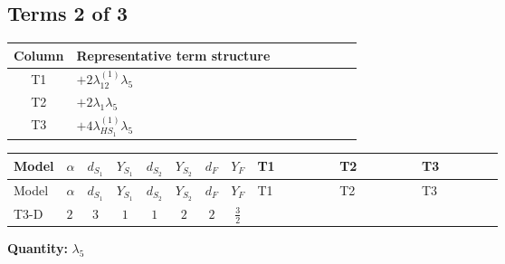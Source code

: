\documentclass[8pt]{article}
\begin{document}
\begin{landscape}
\subsection*{Terms 2 of 3}
\begin{center}
\begin{tabular}{@{}c >{\raggedright\arraybackslash}p{0.82\linewidth}@{}}
\toprule
Column & Representative term structure \\
\midrule
T1 & \(\displaystyle +2 {\lambda_{12}^{(1)}} {\lambda_5}\) \\
\midrule
T2 & \(\displaystyle +2 {\lambda_1} {\lambda_5}\) \\
\midrule
T3 & \(\displaystyle +4 {\lambda_{HS_1}^{(1)}} {\lambda_5}\) \\
\midrule
\bottomrule
\end{tabular}
\end{center}
\smallskip
\tiny
\begin{longtable}{@{}llcccccc >{\raggedright\arraybackslash}p{0.21\linewidth} >{\raggedright\arraybackslash}p{0.21\linewidth} >{\raggedright\arraybackslash}p{0.21\linewidth}@{}}
\toprule
Model & $\alpha$ & $d_{S_1}$ & $Y_{S_1}$ & $d_{S_2}$ & $Y_{S_2}$ & $d_F$ & $Y_F$ & T1 & T2 & T3 \\
\midrule
\endfirsthead
\toprule
Model & $\alpha$ & $d_{S_1}$ & $Y_{S_1}$ & $d_{S_2}$ & $Y_{S_2}$ & $d_F$ & $Y_F$ & T1 & T2 & T3 \\
\midrule
\endhead
T3-D & $2$ & $3$ & $1$ & $1$ & $2$ & $2$ & $\frac{3}{2}$ & \scriptsize\adjustbox{max width=\linewidth}{$\begin{gathered} +2 {\lambda_{12}^{(1)}} {\lambda_5}\end{gathered}$} & \scriptsize\adjustbox{max width=\linewidth}{$\begin{gathered} +2 {\lambda_1} {\lambda_5}\end{gathered}$} & \scriptsize\adjustbox{max width=\linewidth}{$\begin{gathered} +4 {\lambda_{HS_1}^{(1)}} {\lambda_5}\end{gathered}$} \\
\midrule
\bottomrule
\end{longtable}
\clearpage
\noindent\textbf{Quantity: }$\lambda_5$\par\smallskip

\end{landscape}
\end{document}
